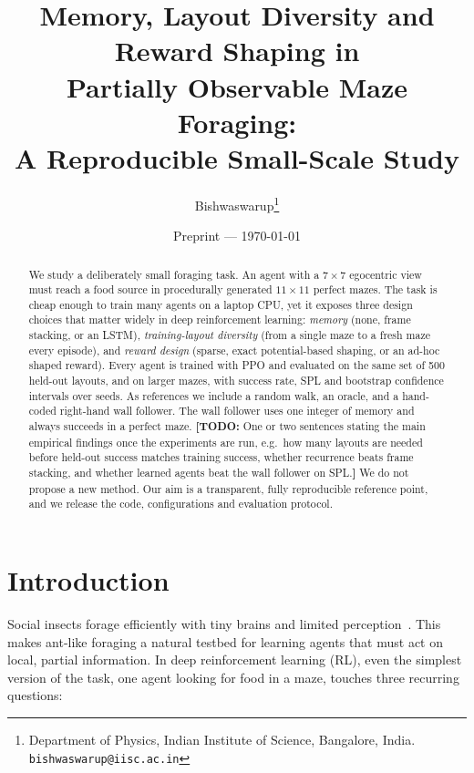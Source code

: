 \documentclass[11pt]{article}
\title{Memory, Layout Diversity and Reward Shaping in\\Partially Observable Maze Foraging:\\A Reproducible Small-Scale Study}
\author{Bishwaswarup\thanks{Department of Physics, Indian Institute of Science, Bangalore, India. \texttt{bishwaswarup@iisc.ac.in}}
}
\date{Preprint --- \today}
\newcommand{\todo}[1]{{\color{red!75!black}\textbf{[TODO:} #1\textbf{]}}}
\begin{document}
\maketitle

\begin{abstract}
We study a deliberately small foraging task. An agent with a $7\times7$
egocentric view must reach a food source in procedurally generated
$11\times11$ perfect mazes. The task is cheap enough to train many agents
on a laptop CPU, yet it exposes three design choices that matter widely in
deep reinforcement learning: \emph{memory} (none, frame stacking, or an
LSTM), \emph{training-layout diversity} (from a single maze to a fresh maze
every episode), and \emph{reward design} (sparse, exact potential-based
shaping, or an ad-hoc shaped reward). Every agent is trained with PPO and
evaluated on the same set of 500 held-out layouts, and on larger mazes, with
success rate, SPL and bootstrap confidence intervals over seeds. As
references we include a random walk, an oracle, and a hand-coded
right-hand wall follower. The wall follower uses one integer of memory and
always succeeds in a perfect maze.
\todo{One or two sentences stating the main empirical findings once the experiments are run, e.g.\ how many layouts are needed before held-out success matches training success, whether recurrence beats frame stacking, and whether learned agents beat the wall follower on SPL.}
We do not propose a new method. Our aim is a transparent, fully
reproducible reference point, and we release the code, configurations and
evaluation protocol.
\end{abstract}

\section{Introduction}

Social insects forage efficiently with tiny brains and limited
perception~\citep{wehner2003desert,bonabeau1999swarm}. This makes ant-like
foraging a natural testbed for learning agents that must act on local,
partial information. In deep reinforcement learning (RL), even the simplest
version of the task, one agent looking for food in a maze, touches three
recurring questions:
\end{document}
